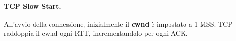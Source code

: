 \paragraph{TCP Slow Start.}
All'avvio della connessione, inizialmente il \textbf{cwnd} è impostato a 1 MSS. 
TCP raddoppia il cwnd ogni RTT, incrementandolo per ogni ACK.
%
